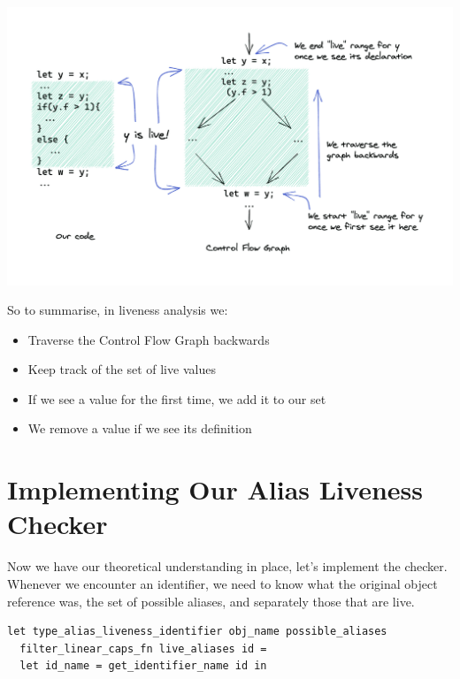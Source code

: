 {
\href{https://mukulrathi.com/static/12ada8741740841a048f22702b12b7f9/5b503/liveness-range.png}{{}
\includegraphics[width=\linewidth]{05_files/liveness-range.png}} }

So to summarise, in liveness analysis we:

\begin{itemize}
\tightlist
\item
  Traverse the Control Flow Graph backwards
\item
  Keep track of the set of live values
\item
  If we see a value for the first time, we add it to our set
\item
  We remove a value if we see its definition
\end{itemize}

\hypertarget{implementing-our-alias-liveness-checker}{%
\section{\texorpdfstring{\protect\hyperlink{implementing-our-alias-liveness-checker}{}Implementing
Our Alias Liveness
Checker}{Implementing Our Alias Liveness Checker}}\label{implementing-our-alias-liveness-checker}}

Now we have our theoretical understanding in place, let's implement the
checker.
%
Whenever we encounter an identifier, we need to know what the original
object reference was, the set of possible aliases, and separately those
that are live.

%

\begin{lstlisting}[caption={type\_alias\_liveness.ml},language=caml]
let type_alias_liveness_identifier obj_name possible_aliases
  filter_linear_caps_fn live_aliases id =
  let id_name = get_identifier_name id in
\end{lstlisting}

